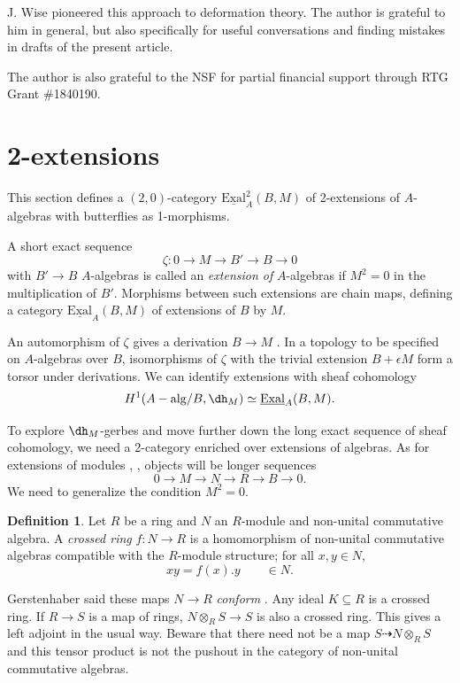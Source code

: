 \documentclass[11pt,reqno]{amsart}
\theoremstyle{definition}
\newtheorem{definition}[theorem]{Definition}
\newcommand{\dd}[1]{\dh_{#1}}
\newcommand{\EExal}{\underline{\textrm{Exal}}}
\newcommand{\Aalg}{A-{\rm alg}}
\begin{document}
J. Wise pioneered this approach to deformation theory. The author is grateful to him in general, but also specifically for useful conversations and finding mistakes in drafts of the present article. 

The author is also grateful to the NSF for partial financial support through RTG Grant \#1840190.






\section{2-extensions}


This section defines a $(2, 0)$-category $\EExal^2_A(B, M)$ of 2-extensions of $A$-algebras with butterflies as 1-morphisms. 

A short exact sequence
\[\zeta : 0 \to M \to B' \to B \to 0\]
with $B' \to B$ $A$-algebras is called an \textit{extension of} $A$-{algebras} if $M^2 = 0$ in the multiplication of $B'$. Morphisms between such extensions are chain maps, defining a category $\EExal_A(B, M)$ of extensions of $B$ by $M$. 

An automorphism of $\zeta$ gives a derivation $B \to M$ \cite[4.3.4]{lichtenbaumschlessinger}. In a topology to be specified on $A$-algebras over $B$, isomorphisms of $\zeta$ with the trivial extension $B + \epsilon M$ form a torsor under derivations. We can identify extensions with sheaf cohomology 
\[H^1(\Aalg/B, \dd{M}) \simeq \EExal_A(B, M).\]

To explore $\dd{M}$-gerbes and move further down the long exact sequence of sheaf cohomology, we need a 2-category enriched over extensions of algebras. As for extensions of modules \cite{mymoduledefms}, \cite{wisebutterflies}, objects will be longer sequences
\[0 \to M \to N \to R \to B \to 0.\]
We need to generalize the condition $M^2=0$. 

\begin{definition}
Let $R$ be a ring and $N$ an $R$-module and non-unital commutative algebra. A \emph{crossed ring} $f : N \to R$ is a homomorphism of non-unital commutative algebras compatible with the $R$-module structure; for all $x, y \in N$,
\begin{equation}\label{eqn:crossedmod}
xy = f(x).y \qquad \in N.
\end{equation}
\end{definition}

Gerstenhaber said these maps $N \to R$ \emph{conform} \cite[Definition 4]{gerstenhaber2}. Any ideal $K \subseteq R$ is a crossed ring. If $R \to S$ is a map of rings, $N \otimes_R S \to S$ is also a crossed ring. This gives a left adjoint in the usual way. Beware that there need not be a map $S \dashrightarrow N \otimes_R S$ and this tensor product is not the pushout in the category of non-unital commutative algebras. 
\end{document}
